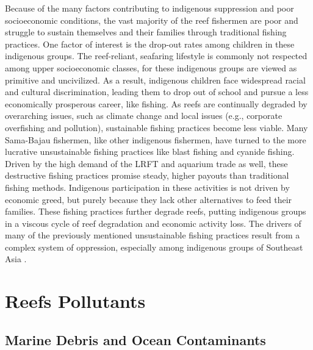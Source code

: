 \documentclass{book}\usepackage{knitr}
\begin{document}
Because of the many factors contributing to indigenous suppression and poor socioeconomic conditions, the vast majority of the reef fishermen are poor and struggle to sustain themselves and their families through traditional fishing practices. One factor of interest is the drop-out rates among children in these indigenous groups. The reef-reliant, seafaring lifestyle is commonly not respected among upper socioeconomic classes, for these indigenous groups are viewed as primitive and uncivilized. As a result, indigenous children face widespread racial and cultural discrimination, leading them to drop out of school and pursue a less economically prosperous career, like fishing. As reefs are continually degraded by overarching issues, such as climate change and local issues (e.g., corporate overfishing and pollution), sustainable fishing practices become less viable. Many Sama-Bajau fishermen, like other indigenous fishermen, have turned to the more lucrative unsustainable fishing practices like blast fishing and cyanide fishing. Driven by the high demand of the LRFT and aquarium trade as well, these destructive fishing practices promise steady, higher payouts than traditional fishing methods. Indigenous participation in these activities is not driven by economic greed, but purely because they lack other alternatives to feed their families. These fishing practices further degrade reefs, putting indigenous groups in a viscous cycle of reef degradation and economic activity loss. The drivers of many of the previously mentioned unsustainable fishing practices result from a complex system of oppression, especially among indigenous groups of Southeast Asia \citep{boatpeople}.

\section{Reefs Pollutants}

\subsection{Marine Debris and Ocean Contaminants} \label{sub:mdoc}
\end{document}
